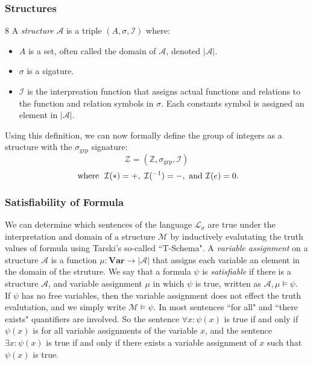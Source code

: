 \documentclass[12pt]{article}
\theoremstyle{definition}
\begin{document}
\subsubsection{Structures}8
\noindent
A \emph{structure} $\mathcal{A}$ is a triple $(A, \sigma,\mathcal{I})$ where:
\begin{itemize}
  \item $A$ is a set, often called the domain of $\mathcal{A}$, denoted $|\mathcal{A}|$.
  \item $\sigma$ is a sigature.
  \item $\mathcal I$ is the interpreation function that assigns actual functions and relations to the function and relation symbols in $\sigma$. Each constants symbol is  assigned an element in $|\mathcal{A}|$.
\end{itemize}
Using this definition, we can now formally define the group of integers as a structure with the $\sigma_{\text{grp}}$ signature:
$$\mathcal{Z} = (\mathbb{Z}, \sigma_{\text{grp}}, \mathcal{I})$$
$$\text{ where \hspace{1mm}} \mathcal{I}(*) = +,\hspace{1mm} \mathcal{I}(^{-1}) = -, \text{ and } \mathcal{I}(e) = 0.$$
\subsubsection{Satisfiability of Formula}
We can determine which sentences of the language $\mathcal{L_\sigma}$ are true under the interpretation and domain of a structure $\mathcal{M}$ by inductively evalutating the truth values of formula using Tarski's so-called ``T-Schema"\cite{tarski}.
A \emph{variable assignment} on a structure $\mathcal{A}$ is a function $\mu: \textbf{Var} \rightarrow |\mathcal{A}|$ that assigns each variable an element in the domain of the struture.
We say that a formula $\psi$ is \emph{satisfiable} if there is a structure $\mathcal A$, and variable assignment $\mu$ in which $\psi$ is true, written as $\mathcal{A}, \mu \vDash \psi$.\\

\noindent
If $\psi$ has no free variables, then the variable assignment does not effect the truth evalutation, and we simply write $\mathcal{M} \vDash \psi$.
In most sentences ``for all" and ``there exists" quantifiers are involved.
So the sentence $\forall x: \psi(x)$ is true if and only if $\psi(x)$ is for all variable assignments of the variable $x$, and the sentence $\exists x: \psi(x)$ is true if and only if there exists a variable assignment of $x$ such that $\psi(x)$ is true.
\end{document}
